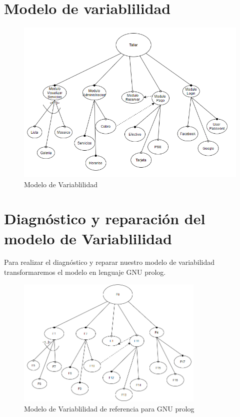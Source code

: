 \documentclass[10pt,a4paper,openany]{book}
\begin{document}
\section{Modelo de variablilidad}

\begin{figure}[h]
	\centering
	\includegraphics[width=1\textwidth]{img3}
	\caption{Modelo de Variablilidad}
	\label{fig:img3}
\end{figure} 


\section{Diagnóstico y reparación del modelo de Variablilidad}
Para realizar el diagnóstico y reparar nuestro modelo de variabilidad transformaremos el modelo en lenguaje GNU prolog.\\
\begin{figure}[h]
	\centering
	\includegraphics[width=0.8\textwidth]{img4}
	\caption{Modelo de Variablilidad de referencia para GNU prolog}
	\label{fig:img4}
\end{figure} 
\end{document}

